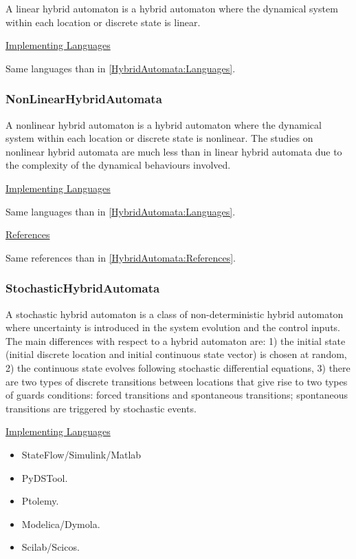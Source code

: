 A linear hybrid automaton is a hybrid automaton where the dynamical system within each location or discrete state is linear.

\underline{Implementing Languages}

Same languages than in \ref{HybridAutomata:Languages}.




\subsubsection{NonLinearHybridAutomata}
\label{subsubsecF:NonLinearHybridAutomata}

A nonlinear hybrid automaton is a hybrid automaton where the dynamical system within each location or discrete state is nonlinear. The studies on nonlinear hybrid automata are much less than in linear hybrid automata due to the complexity of the dynamical behaviours involved.

\underline{Implementing Languages}

Same languages than in \ref{HybridAutomata:Languages}.


\underline{References}

Same references than in \ref{HybridAutomata:References}.

\subsubsection{StochasticHybridAutomata}
\label{subsubsecF:StochasticHybridAutomata}

A stochastic hybrid automaton is a class of non-deterministic hybrid automaton where uncertainty is introduced  in the system evolution and the control inputs. The main differences with respect to a hybrid automaton are: 1) the initial state (initial discrete location and initial continuous state vector) is chosen at random, 2) the continuous state evolves following stochastic differential equations, 3) there are two types of discrete transitions between locations that give rise to two types of guards conditions: forced transitions and spontaneous transitions; spontaneous transitions are triggered by stochastic events.


\underline{Implementing Languages}

\begin{itemize}
    \item StateFlow/Simulink/Matlab
	\item PyDSTool.
    \item Ptolemy.
    \item Modelica/Dymola.
    \item Scilab/Scicos. 
\end{itemize}


